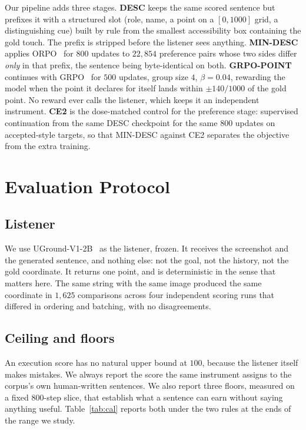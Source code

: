 \documentclass[runningheads,a4paper]{llncs}
\begin{document}
Our pipeline adds three stages. \textbf{DESC} keeps the same scored sentence but prefixes it with
a structured slot (role, name, a point on a $[0,1000]$ grid, a distinguishing cue) built by rule
from the smallest accessibility box containing the gold touch. The prefix is stripped before the
listener sees anything. \textbf{MIN-DESC} applies ORPO~\cite{orpo} for $800$ updates to
$22{,}854$ preference pairs whose two sides differ \emph{only} in that prefix, the sentence being
byte-identical on both. \textbf{GRPO-POINT} continues with GRPO~\cite{grpo} for $500$ updates,
group size $4$, $\beta = 0.04$, rewarding the model when the point it declares for itself lands
within $\pm 140/1000$ of the gold point. No reward ever calls the listener, which keeps it an
independent instrument. \textbf{CE2} is the dose-matched control for the preference
stage: supervised continuation from the same DESC checkpoint for the same $800$ updates on
accepted-style targets, so that MIN-DESC against CE2 separates the objective from the extra
training.

\section{Evaluation Protocol}
\label{sec:protocol}

\subsection{Listener}
We use UGround-V1-2B~\cite{uground} as the listener, frozen. It receives the screenshot and the
generated sentence, and nothing else: not the goal, not the history, not the gold coordinate. It
returns one point, and is deterministic in the sense that matters here. The same
string with the same image produced the same coordinate in $1{,}625$ comparisons across four
independent scoring runs that differed in ordering and batching, with no disagreements.

\subsection{Ceiling and floors}
An execution score has no natural upper bound at $100$, because the listener itself makes
mistakes. We
always report the score the same instrument assigns to the corpus's own human-written
sentences. We also report three floors, measured on a fixed $800$-step slice, that
establish what a sentence can earn without saying anything useful. Table~\ref{tab:cal} reports
both under the two rules at the ends of the range we study.
\end{document}
